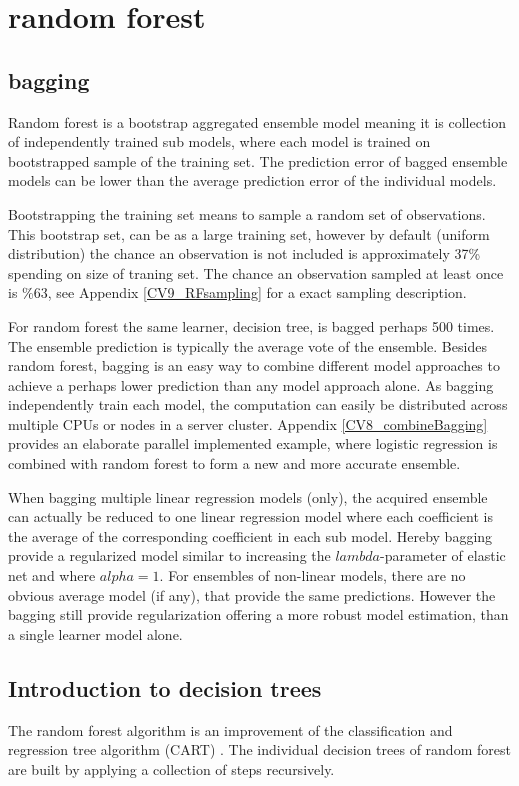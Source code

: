 \section{random forest}

\subsection{bagging}
Random forest is a bootstrap aggregated ensemble model meaning it is collection of independently trained sub models, where each model is trained on bootstrapped sample of the training set. The prediction error of bagged ensemble models can be lower than the average prediction error of the individual models.

Bootstrapping the training set means to sample a random set of observations. This bootstrap set, can be as a large training set, however by default (uniform distribution) the chance an observation is not included is approximately 37\% spending on size of traning set. The chance an observation sampled at least once is \%63, see Appendix \ref{CV9_RFsampling} for a exact sampling description.

For random forest the same learner, decision tree, is bagged perhaps 500 times. The ensemble prediction is typically the average vote of the ensemble. Besides random forest, bagging is an easy way to combine different model approaches to achieve a perhaps lower prediction than any model approach alone. As bagging independently train each model, the computation can easily be distributed across multiple CPUs or nodes in a server cluster. Appendix \ref{CV8_combineBagging} provides an elaborate parallel implemented example, where logistic regression is combined with random forest to form a new and more accurate ensemble.

When bagging multiple linear regression models (only), the acquired ensemble can actually be reduced to one linear regression model where each coefficient is the average of the corresponding coefficient in each sub model. Hereby bagging provide a regularized model similar to increasing the $lambda$-parameter of elastic net and where $alpha=1$. For ensembles of non-linear models, there are no obvious average model (if any), that provide the same predictions. However the bagging still provide regularization offering a more robust model estimation, than a single learner model alone.


\subsection{Introduction to decision trees}
The random forest algorithm is an improvement of the classification and regression tree algorithm (CART) \cite{breiman1984classification,breiman2001random}. The individual decision trees of random forest are built by applying a collection of steps recursively.

